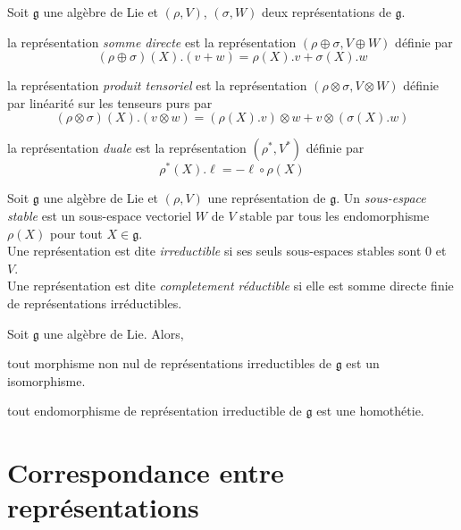 \begin{definition}
    Soit $\mathfrak{g}$ une algèbre de Lie et $(\rho, V)$, $(\sigma, W)$ deux représentations de $\mathfrak{g}$.
    \begin{ilist}
        \item la représentation \emph{somme directe} est la représentation $(\rho \oplus \sigma, V \oplus W)$ définie par 
        $$(\rho \oplus \sigma)(X).(v+w) = \rho(X).v  + \sigma(X).w$$
        \item la représentation \emph{produit tensoriel} est la représentation $(\rho \otimes \sigma, V \otimes W)$ définie par linéarité sur les tenseurs purs par
        $$(\rho \otimes \sigma)(X).(v\otimes w) = (\rho(X).v)\otimes w + v \otimes (\sigma(X).w)$$
        \item la représentation \emph{duale} est la représentation $(\rho^*, V^*)$ définie par 
        $$\rho^*(X).\ell = - \ell \circ \rho(X)$$
    \end{ilist}
\end{definition}

\begin{definition}
    Soit $\mathfrak{g}$ une algèbre de Lie et $(\rho, V)$ une représentation de $\mathfrak{g}$. Un \emph{sous-espace stable} est un sous-espace vectoriel $W$ de $V$ stable par tous les endomorphisme $\rho(X)$ pour tout $X\in \mathfrak{g}$. \\
    Une représentation est dite \emph{irreductible} si ses seuls sous-espaces stables sont $0$ et $V$. \\
    Une représentation est dite \emph{completement réductible} si elle est somme directe finie de représentations irréductibles.
\end{definition}

\begin{lemma}
    Soit $\mathfrak{g}$ une algèbre de Lie. Alors,
    \begin{ilist}
        \item tout morphisme non nul de représentations irreductibles de $\mathfrak{g}$ est un isomorphisme.
        \item tout endomorphisme de représentation irreductible de $\mathfrak{g}$ est une homothétie.
    \end{ilist}
\end{lemma}

\section{Correspondance entre représentations}

